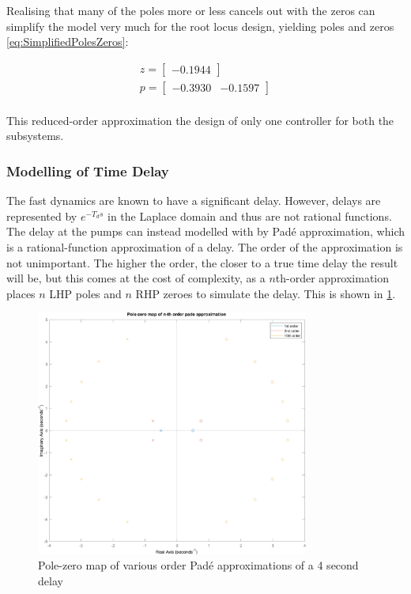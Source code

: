 Realising that many of the poles more or less cancels out with the zeros can simplify the model very much for the root locus design, yielding poles and zeros \cref{eq:SimplifiedPolesZeros}:

 \begin{equation}\label{eq:SimplifiedPolesZeros}
 	\begin{gathered}
 		z = \begin{bmatrix}  -0.1944 \end{bmatrix} \\
 		p = \begin{bmatrix}  -0.3930&  -0.1597 \end{bmatrix} \\
 	\end{gathered}
 \end{equation}


This reduced-order approximation the design of only one controller for both the subsystems.

\subsubsection{Modelling of Time Delay}
The fast dynamics are known to have a significant delay. However, delays are represented by $e^{-T_ds}$ in the Laplace domain and thus are not rational functions. The delay at the pumps can instead modelled with by Padé approximation, which is a rational-function approximation of a delay. The order of the approximation is not unimportant. The higher the order, the closer to a true time delay the result will be, but this comes at the cost of complexity, as a $n$th-order approximation places $n$ LHP poles and $n$ RHP zeroes to simulate the delay. This is shown in \cref{fig:PadeApprox}.
\begin{figure}[h!]
	\centering
	\includegraphics[width=0.8\textwidth]{Pictures/PadeApprox.png}
	\caption{Pole-zero map of various order Padé approximations of a 4 second delay}
	\label{fig:PadeApprox}
\end{figure}

